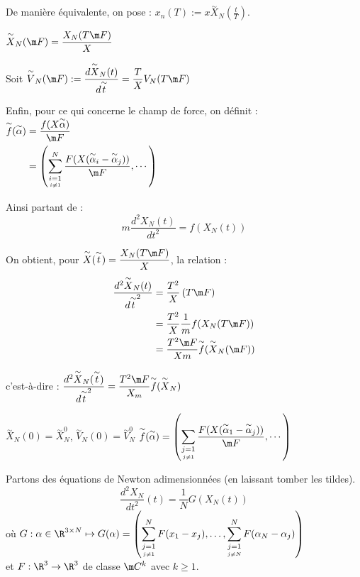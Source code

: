 \documentclass[12pt,a4paper]{article}
\begin{document}
	De manière équivalente, on pose : $x_n(T) := x\overset{\sim}{X}_N\left(\frac{t}{T}\right)$.
	
	$\overset{\sim}{X}_N(\m F) = \dfrac{X_N(T\m F)}{X}$
	
	Soit $\overset{\sim}{V}_N(\m F) := \dfrac{d \overset{\sim}{X}_N(t)}{d\overset{\sim}{t}} = \dfrac{T}{X} V_N(T\m F)$
	
	\par Enfin, pour ce qui concerne le champ de force, on définit : $\begin{aligned}[t]
		\overset{\sim}{f}(\overset{\sim}{\alpha}) 
		&= \dfrac{f(X\overset{\sim}{\alpha})}{\m F} \\
		&= \left(\displaystyle\sum_{\underset{i\not=1}{i=1}}^N \dfrac{F(X(\overset{\sim}{\alpha}_i-\overset{\sim}{\alpha}_j))}{\m F}, \cdots \right)
	\end{aligned}$
	
	Ainsi partant de :
	\[
	m\dfrac{d^2X_N(t)}{dt^2} = f(X_N(t))
	\]
	
	On obtient, pour $\overset{\sim}{X}(\overset{\sim}{t}) = \dfrac{X_N(T\m F)}{X}$, la relation :
	\[
	\begin{aligned}[t]
		\dfrac{d^2\overset{\sim}{X}_N(t)}{d\overset{\sim}{t}^2} 
		&= \dfrac{T^2}{X}\left(T\m F\right) \\
		&= \dfrac{T^2}{X}\frac{1}{m}f(X_N(T\m F)) \\
		&= \dfrac{T^2\m F}{Xm} \overset{\sim}{f}(\overset{\sim}{X}_N(\m F))
	\end{aligned}
	\]
	
	c'est-à-dire : $\dfrac{d^2\overset{\sim}{X}_N(\overset{\sim}{t})}{d\overset{\sim}{t}^2} = \dfrac{T^2\m F}{X_m} \overset{\sim}{f}(\overset{\sim}X_N)$
	
	\fbox{+} $\overset{\sim}X_N(0) = \overset{\sim}X_N^0$, $\overset{\sim}{V}_N(0) = \overset{\sim}V_N^0$ \hspace{1cm} \fbox{+} $\overset{\sim}f(\overset{\sim}\alpha) = \left(\displaystyle\sum_{\underset{j\not = 1}{j=1}} \frac{F(X(\overset{\sim}\alpha_1-\overset{\sim}\alpha_j))}{\m F}, \cdots\right)$
	
	
	\par Partons des équations de Newton adimensionnées (en laissant tomber les tildes).
	\[
	\dfrac{d^2X_N}{dt^2}(t) = \dfrac{1}{N}G(X_N(t))
	\]
	où $G : \alpha \in \R^{3 \times N} \mapsto G(\alpha) = \left(\displaystyle\sum_{\underset{j\not = 1}{j=1}}^N F(x_1-x_j),\ldots,\sum_{\underset{j\not = N}{j=1}}^N F(\alpha_N-\alpha_j)\right)$\\ 
	et $F : \R^3 \to \R^3$ de classe $\m C^k$ avec $k \geq 1$.
	
\end{document}
